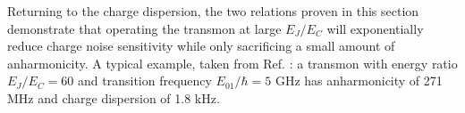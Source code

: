 \documentclass[11 pt, oneside]{book} %
\begin{document}
Returning to the charge dispersion, the two relations proven in this section demonstrate that operating the transmon at large $E_J/E_C$ will exponentially reduce charge noise sensitivity while only sacrificing a small amount of anharmonicity. A typical example, taken from Ref. \cite{Bishop}: a transmon with energy ratio $E_J/E_C=60$ and transition frequency $E_01/\hbar=5$ GHz has anharmonicity of 271 MHz and charge dispersion of 1.8 kHz. 

%
\end{document}

